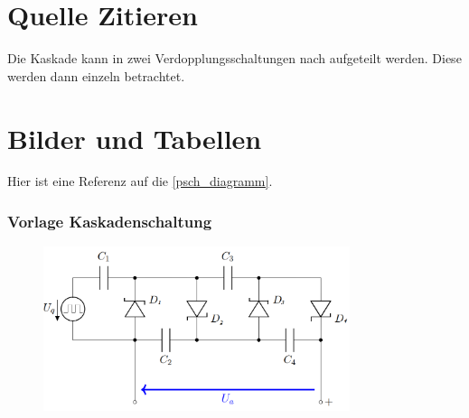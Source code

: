 \documentclass[
12pt,
a4paper,
headings=small,                    %
bibliography=totoc,                %
listof=totoc,                      %
parskip=half*,                     %
]{scrartcl}                        %
\begin{document}
\section{Quelle Zitieren}
Die Kaskade kann in zwei Verdopplungsschaltungen nach \autocite[42]{moeller} aufgeteilt werden. Diese werden dann einzeln betrachtet.

\section{Bilder und Tabellen}
Hier ist eine Referenz auf die \autoref{psch_diagramm}.
\begin{figure}[H]
    \centering
    \label{psch_diagramm}
\end{figure}

\resetlaborsectioncounter
{}
\subsubsection{Vorlage Kaskadenschaltung}
\begin{figure}[H]
    \centering
    \includegraphics[width=0.8\textwidth]{schaltung}
    \label{kaskadenschaltung}
\end{figure}
\end{document}
